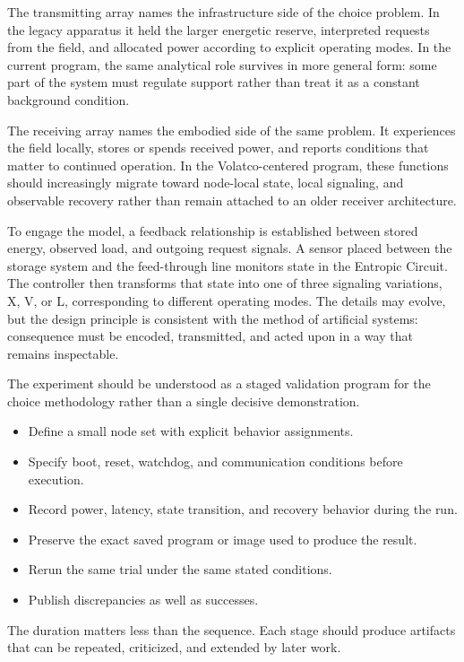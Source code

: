 \documentclass[a4paper,english]{article}
\begin{document}
The transmitting array names the infrastructure side of the choice
problem. In the legacy apparatus it held the larger energetic reserve,
interpreted requests from the field, and allocated power according
to explicit operating modes. In the current program, the same analytical
role survives in more general form: some part of the system must regulate
support rather than treat it as a constant background condition.

The receiving array names the embodied side of the same problem. It
experiences the field locally, stores or spends received power, and
reports conditions that matter to continued operation. In the Volatco-centered
program, these functions should increasingly migrate toward node-local
state, local signaling, and observable recovery rather than remain
attached to an older receiver architecture.

To engage the model, a feedback relationship is established between
stored energy, observed load, and outgoing request signals. A sensor
placed between the storage system and the feed-through line monitors
state in the Entropic Circuit. The controller then transforms that
state into one of three signaling variations, X, V, or L, corresponding
to different operating modes. The details may evolve, but the design
principle is consistent with the method of artificial systems: consequence
must be encoded, transmitted, and acted upon in a way that remains
inspectable.

The experiment should be understood as a staged validation program
for the choice methodology rather than a single decisive demonstration.
\begin{itemize}
\item Define a small node set with explicit behavior assignments.
\item Specify boot, reset, watchdog, and communication conditions before
execution.
\item Record power, latency, state transition, and recovery behavior during
the run.
\item Preserve the exact saved program or image used to produce the result.
\item Rerun the same trial under the same stated conditions.
\item Publish discrepancies as well as successes.
\end{itemize}
The duration matters less than the sequence. Each stage should produce
artifacts that can be repeated, criticized, and extended by later
work.
\end{document}
